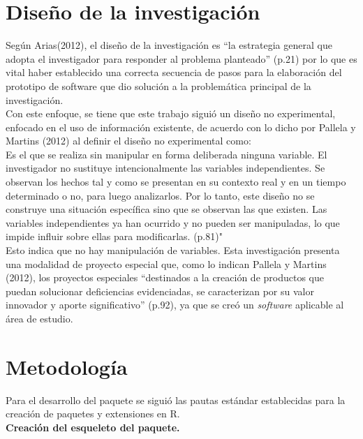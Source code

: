 \section{Dise\~no de la investigaci\'on}
	
Seg\'un Arias(2012), el dise\~no de la investigaci\'on es “la estrategia general que adopta el investigador para responder al problema planteado” (p.21) por lo que es vital haber establecido una correcta secuencia de pasos para la elaboraci\'on del prototipo de software que dio soluci\'on a la problem\'atica principal de la investigaci\'on.\\

Con este enfoque, se tiene que este trabajo sigui\'o un dise\~no no experimental, enfocado en el uso de informaci\'on existente, de acuerdo con lo dicho por Pallela y  Martins (2012) al definir el dise\~no no experimental como:\\

Es el que se realiza sin manipular en forma deliberada ninguna variable. El investigador no sustituye intencionalmente las variables independientes. Se observan los hechos tal y como se presentan en su contexto real y en un tiempo determinado o no, para luego analizarlos. Por lo tanto, este dise\~no no se construye una situaci\'on espec\'ifica sino que se observan las que existen. Las variables independientes ya han ocurrido y no pueden ser manipuladas, lo que impide influir sobre ellas para modificarlas. (p.81)"\\

Esto indica que no hay manipulaci\'on de variables. Esta investigaci\'on presenta una modalidad de proyecto especial que, como lo indican Pallela y  Martins (2012), los proyectos especiales “destinados a la creaci\'on de productos que puedan solucionar deficiencias evidenciadas, se caracterizan por su valor innovador y aporte significativo” (p.92), ya que se cre\'o un \emph{software} aplicable al \'area de estudio.\\

\section{Metodolog\'ia}

Para el desarrollo del paquete  se sigui\'o las pautas est\'andar establecidas para la creación de paquetes y extensiones en R.\\

\noindent
\textbf{Creación del esqueleto del paquete.}\\


